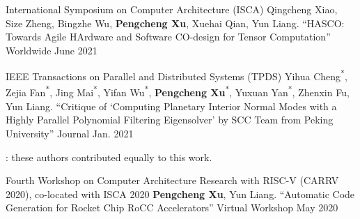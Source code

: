 
\clearpage



\begin{cventries}

  \cventry
    {International Symposium on Computer Architecture (ISCA)}
    {{\normalfont Qingcheng Xiao, Size Zheng, Bingzhe Wu, \textbf{Pengcheng Xu}, Xuehai Qian, Yun Liang. ``HASCO: Towards Agile HArdware and Software CO-design for Tensor Computation''}}
    {Worldwide} %
    {June 2021} %
    {}

  \cventry
    {IEEE Transactions on Parallel and Distributed Systems (TPDS)}
    {{\normalfont Yihua Cheng\textsuperscript{*}, Zejia Fan\textsuperscript{*}, Jing Mai\textsuperscript{*}, Yifan Wu\textsuperscript{*}, \textbf{Pengcheng Xu}\textsuperscript{*}, Yuxuan Yan\textsuperscript{*}, Zhenxin Fu, Yun Liang. ``Critique of `Computing Planetary Interior Normal Modes with a Highly Parallel Polynomial Filtering Eigensolver' by SCC Team from Peking University''}}
    {Journal} %
    {Jan. 2021} %
    {
      \begin{cvitems} %
      \item {\footnotesize *: these authors contributed equally to this work.}
      \end{cvitems}
    }

  \cventry
    {Fourth Workshop on Computer Architecture Research with RISC-V (CARRV 2020), co-located with ISCA 2020} %
    {{\normalfont \textbf{Pengcheng Xu}, Yun Liang. ``Automatic Code Generation for Rocket Chip RoCC Accelerators''}} %
    {Virtual Workshop} %
    {May 2020} %
    {}
\end{cventries}
